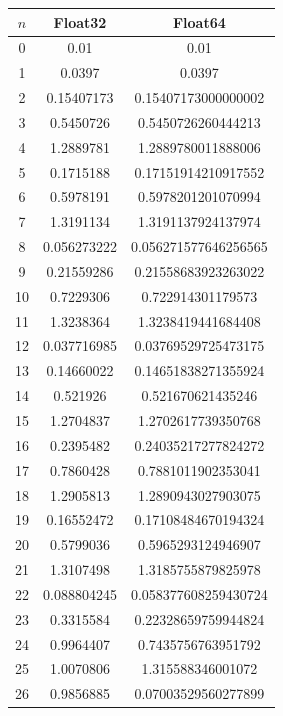 \documentclass[a4paper, 12pt]{article}
\begin{document}
\begin{longtable}[H]{ccc}
\toprule
$n$ & Float32     & Float64              \\ \midrule \endhead
0   & 0.01        & 0.01                 \\ \midrule
1   & 0.0397      & 0.0397               \\ \midrule
2   & 0.15407173  & 0.15407173000000002  \\ \midrule
3   & 0.5450726   & 0.5450726260444213   \\ \midrule
4   & 1.2889781   & 1.2889780011888006   \\ \midrule
5   & 0.1715188   & 0.17151914210917552  \\ \midrule
6   & 0.5978191   & 0.5978201201070994   \\ \midrule
7   & 1.3191134   & 1.3191137924137974   \\ \midrule
8   & 0.056273222 & 0.056271577646256565 \\ \midrule
9   & 0.21559286  & 0.21558683923263022  \\ \midrule
10  & 0.7229306   & 0.722914301179573    \\ \midrule
11  & 1.3238364   & 1.3238419441684408   \\ \midrule
12  & 0.037716985 & 0.03769529725473175  \\ \midrule
13  & 0.14660022  & 0.14651838271355924  \\ \midrule
14  & 0.521926    & 0.521670621435246    \\ \midrule
15  & 1.2704837   & 1.2702617739350768   \\ \midrule
16  & 0.2395482   & 0.24035217277824272  \\ \midrule
17  & 0.7860428   & 0.7881011902353041   \\ \midrule
18  & 1.2905813   & 1.2890943027903075   \\ \midrule
19  & 0.16552472  & 0.17108484670194324  \\ \midrule
20  & 0.5799036   & 0.5965293124946907   \\ \midrule
21  & 1.3107498   & 1.3185755879825978   \\ \midrule
22  & 0.088804245 & 0.058377608259430724 \\ \midrule
23  & 0.3315584   & 0.22328659759944824  \\ \midrule
24  & 0.9964407   & 0.7435756763951792   \\ \midrule
25  & 1.0070806   & 1.315588346001072    \\ \midrule
26  & 0.9856885   & 0.07003529560277899  \\ \midrule

\end{longtable}
\end{document}
